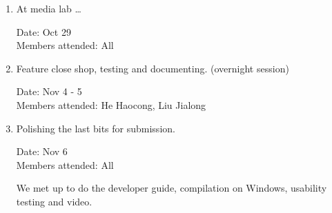 \documentclass[12pt, a4paper]{article}
\begin{document}
\begin{enumerate}
\item At media lab \ldots

Date: Oct 29\\
Members attended: All

\item Feature close shop, testing and documenting. (overnight session)

Date: Nov 4 - 5\\
Members attended: He Haocong, Liu Jialong

\item Polishing the last bits for submission.

Date: Nov 6\\
Members attended: All

We met up to do the developer guide, compilation on Windows, usability testing and video.
\end{enumerate}
\end{document}
